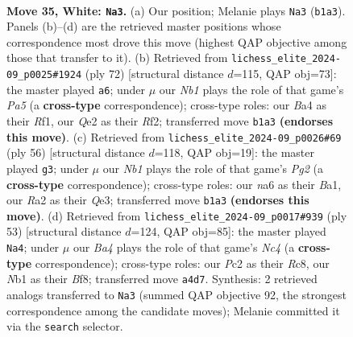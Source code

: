 \documentclass[11pt]{article}
\begin{document}
\clearpage

\begin{figure}[p]\centering
\begin{subfigure}{0.46\textwidth}\centering
\resizebox{\linewidth}{!}{%
\newchessgame
\chessboard[
  setfen={r1b2r2/pp3p1k/n4Bp1/q2p4/B5pP/1P6/R1PNQP2/1N2R1K1 w - - 0 35},
  showmover=false,
  pgfstyle=straightmove, color=movearrow, markmove={b1-a3}
]}
\caption{}
\end{subfigure}\hfill
\begin{subfigure}{0.46\textwidth}\centering
\resizebox{\linewidth}{!}{%
\newchessgame
\chessboard[
  setfen={1r3b1k/6p1/1N1pn2r/PQ1Np2p/4Pp2/2P2P1q/1P3R1B/5R1K w - - 1 37},
  showmover=false,
  pgfstyle=straightmove, color=movearrow, markmove={a5-a6}
]}
\caption{}
\end{subfigure}
\\[4pt]
\begin{subfigure}{0.46\textwidth}\centering
\resizebox{\linewidth}{!}{%
\newchessgame
\chessboard[
  setfen={2r1r1k1/1p2pp2/p2p1bp1/q2P4/2PN4/1P2Q3/5PP1/B2R2K1 w - - 1 29},
  showmover=false,
  pgfstyle=straightmove, color=movearrow, markmove={g2-g3}
]}
\caption{}
\end{subfigure}\hfill
\begin{subfigure}{0.46\textwidth}\centering
\resizebox{\linewidth}{!}{%
\newchessgame
\chessboard[
  setfen={2r1rbk1/2q2p1p/1p2p1p1/2n1P3/1PQB1P2/6PP/6BK/1R1R4 b - - 0 27},
  showmover=false,
  pgfstyle=straightmove, color=movearrow, markmove={c5-a4}
]}
\caption{}
\end{subfigure}
\caption{\textbf{Move 35, White: \texttt{Na3}.} (a) Our position; Melanie plays \texttt{Na3} (\texttt{b1a3}). Panels (b)--(d) are the retrieved master positions whose correspondence most drove this move (highest QAP objective among those that transfer to it). (b) Retrieved from \texttt{lichess\_elite\_2024-09\_p0025\#1924} (ply 72) [structural distance $d$=115, QAP obj=73]: the master played \texttt{a6}; under $\mu$ our \emph{Nb1} plays the role of that game's \emph{Pa5} (a \textbf{cross-type} correspondence); cross-type roles: our \emph{B}a4 as their \emph{R}f1, our \emph{Q}e2 as their \emph{R}f2; transferred move \texttt{b1a3} \textbf{(endorses this move)}. (c) Retrieved from \texttt{lichess\_elite\_2024-09\_p0026\#69} (ply 56) [structural distance $d$=118, QAP obj=19]: the master played \texttt{g3}; under $\mu$ our \emph{Nb1} plays the role of that game's \emph{Pg2} (a \textbf{cross-type} correspondence); cross-type roles: our \emph{n}a6 as their \emph{B}a1, our \emph{R}a2 as their \emph{Q}e3; transferred move \texttt{b1a3} \textbf{(endorses this move)}. (d) Retrieved from \texttt{lichess\_elite\_2024-09\_p0017\#939} (ply 53) [structural distance $d$=124, QAP obj=85]: the master played \texttt{Na4}; under $\mu$ our \emph{Ba4} plays the role of that game's \emph{Nc4} (a \textbf{cross-type} correspondence); cross-type roles: our \emph{P}c2 as their \emph{R}c8, our \emph{N}b1 as their \emph{B}f8; transferred move \texttt{a4d7}. Synthesis: 2 retrieved analogs transferred to \texttt{Na3} (summed QAP objective 92, the strongest correspondence among the candidate moves); Melanie committed it via the \texttt{search} selector.}
\label{fig:thought-m68}
\end{figure}
\end{document}
